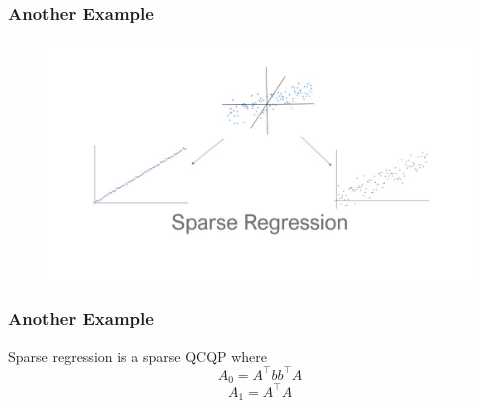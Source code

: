 \documentclass{beamer}
\newcommand{\st}{{\text{ s.t. }}}
\begin{document}
\begin{frame}
    \frametitle{Another Example}
    \begin{figure}[h]
        \centering
        \includegraphics[width=\linewidth]{slide3.jpg}
    \end{figure}
\end{frame}
\begin{frame}
    \frametitle{Another Example}
    Sparse regression is a sparse QCQP where
    \[
        A_0 = A^{\intercal}bb^{\intercal}A
    \]
    \[
        A_1 = A^{\intercal}A
    \]
\end{frame}
\end{document}
